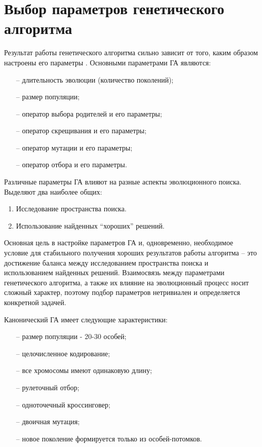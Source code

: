\section{Выбор параметров генетического алгоритма}
Результат работы генетического алгоритма сильно зависит от того, каким образом настроены его параметры \cite{charsGA}. Основными параметрами ГА являются:
\begin{itemize}
	\item[--] длительность эволюции (количество поколений);
	\item[--] размер популяции;
	\item[--] оператор выбора родителей и его параметры;
	\item[--] оператор скрещивания и его параметры;
	\item[--] оператор мутации и его параметры;
	\item[--] оператор отбора и его параметры.
\end{itemize}

Различные параметры ГА влияют на разные аспекты эволюционного поиска. Выделяют два наиболее общих:
\begin{enumerate}
	\item Исследование пространства поиска.
	\item Использование найденных ``хороших'' решений.
\end{enumerate}

Основная цель в настройке параметров ГА и, одновременно, необходимое условие для стабильного получения хороших результатов работы алгоритма – это достижение баланса между исследованием пространства поиска и использованием найденных решений. Взаимосвязь между параметрами генетического алгоритма, а также их влияние на эволюционный процесс носит сложный характер, поэтому подбор параметров нетривиален и определяется конкретной задачей.

Канонический ГА имеет следующие характеристики:
\begin{itemize}
	\item[--] размер популяции - 20-30 особей;
	\item[--] целочисленное кодирование;
	\item[--] все хромосомы имеют одинаковую длину;
	\item[--] рулеточный отбор;
	\item[--] одноточечный кроссинговер;
	\item[--] двоичная мутация;
	\item[--] новое поколение формируется только из особей-потомков.
\end{itemize}

